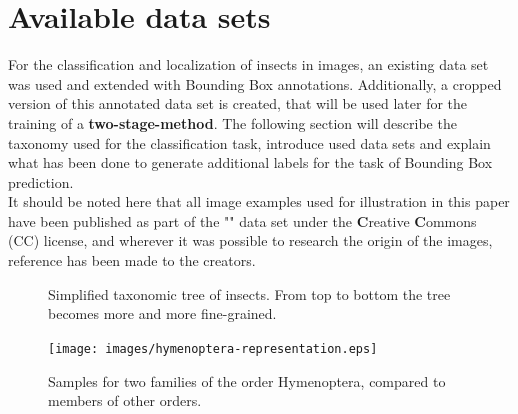 \section{Available data sets}\label{sec:available-data-sets}
For the classification and localization of insects in images, an existing data set was used and extended with Bounding Box annotations.
Additionally, a cropped version of this annotated data set is created, that will be used later for the training of a \textbf{two-stage-method}.
The following section will describe the taxonomy used for the classification task, introduce used data sets
and explain what has been done to generate additional labels for the task of Bounding Box prediction.\\
It should be noted here that all image examples used for illustration in this paper have been published as part of the "" data set under the \textbf{C}reative \textbf{C}ommons (CC) license, and wherever it was possible to research the origin of the images, reference has been made to the creators.

\begin{figure}[!ht]
\centering
\begin{minipage}{.45\textwidth}
\vspace{1.2cm}
\centering
    \caption{Simplified taxonomic tree of insects.
From top to bottom the tree becomes more and more fine-grained.}
    \label{fig:taxonomy}

\end{minipage}
\hfill
\begin{minipage}{.45\textwidth}

    \texttt{[image: images/hymenoptera-representation.eps]}
    \caption{
    Samples for two families of the order Hymenoptera, compared to members of other orders.
    }
    \label{fig:hymenoptera-families}
\end{minipage}
\end{figure}
